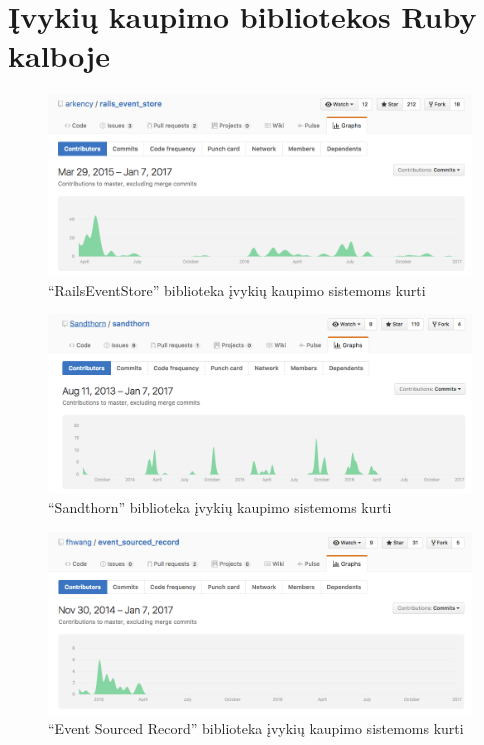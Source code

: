 \documentclass{VUMIFPSmagistrinis}
\begin{document}
\section{Įvykių kaupimo bibliotekos Ruby kalboje}

\begin{figure}[H]
    \centering
    \includegraphics[scale=0.35]{img/rails_event_store}
    \caption{``RailsEventStore'' biblioteka įvykių kaupimo sistemoms kurti}
    \label{img:rails_event_store}
\end{figure}

\begin{figure}[H]
    \centering
    \includegraphics[scale=0.35]{img/sandthorn}
    \caption{``Sandthorn'' biblioteka įvykių kaupimo sistemoms kurti}
    \label{img:sandthorn}
\end{figure}

\begin{figure}[H]
    \centering
    \includegraphics[scale=0.35]{img/event_sourced_record}
    \caption{``Event Sourced Record'' biblioteka įvykių kaupimo sistemoms kurti}
    \label{img:event_sourced_record}
\end{figure}
\end{document}
